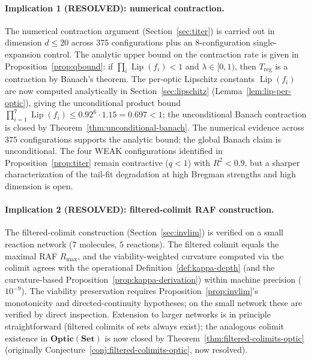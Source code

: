 \documentclass[11pt,a4paper]{article}
\theoremstyle{plain}
\theoremstyle{definition}
\theoremstyle{remark}
\newcommand{\Optic}{\mathbf{Optic}}
\DeclareMathOperator{\Lip}{Lip}
\begin{document}
\paragraph{Implication 1 (RESOLVED): numerical contraction.}
The numerical contraction argument (Section~\ref{sec:titer}) is carried
out in dimension $d\leq 20$ across $375$ configurations plus an
$8$-configuration single-expansion control. The analytic upper bound
on the contraction rate is given in Proposition~\ref{prop:qbound}: if
$\prod_i \Lip(f_i) < 1$ and $\lambda \in [0, 1)$, then $T_{\mathrm{reg}}$
is a contraction by Banach's theorem. The per-optic Lipschitz
constants $\Lip(f_i)$ are now computed analytically in
Section~\ref{sec:lipschitz} (Lemma~\ref{lem:lip-per-optic}), giving
the unconditional product bound
$\prod_{i=1}^{7}\Lip(f_{i})\leq 0.92^{6}\cdot 1.15 = 0.697 < 1$; the
unconditional Banach contraction is closed by
Theorem~\ref{thm:unconditional-banach}. The numerical evidence across
$375$ configurations supports the analytic bound; the global Banach
claim is unconditional. The four WEAK configurations identified in
Proposition~\ref{prop:titer} remain contractive ($q<1$) with
$R^2 < 0.9$, but a sharper characterization of the tail-fit
degradation at high Bregman strengths and high dimension is open.

\paragraph{Implication 2 (RESOLVED): filtered-colimit RAF construction.}
The filtered-colimit construction (Section~\ref{sec:invlim}) is verified
on a small reaction network ($7$ molecules, $5$ reactions). The filtered
colimit equals the maximal RAF $R_{\max}$, and the viability-weighted
curvature computed via the colimit agrees with the operational
Definition~\ref{def:kappa-depth} (and the curvature-based
Proposition~\ref{prop:kappa-derivation}) within machine precision
($10^{-9}$). The viability preservation requires
Proposition~\ref{prop:invlim}'s monotonicity and directed-continuity
hypotheses; on the small network these are verified by direct
inspection. Extension to larger networks is in principle
straightforward (filtered colimits of sets always exist); the
analogous colimit existence in $\Optic(\mathbf{Set})$ is now closed
by Theorem~\ref{thm:filtered-colimits-optic} (originally
Conjecture~\ref{conj:filtered-colimits-optic}, now resolved).
\end{document}
